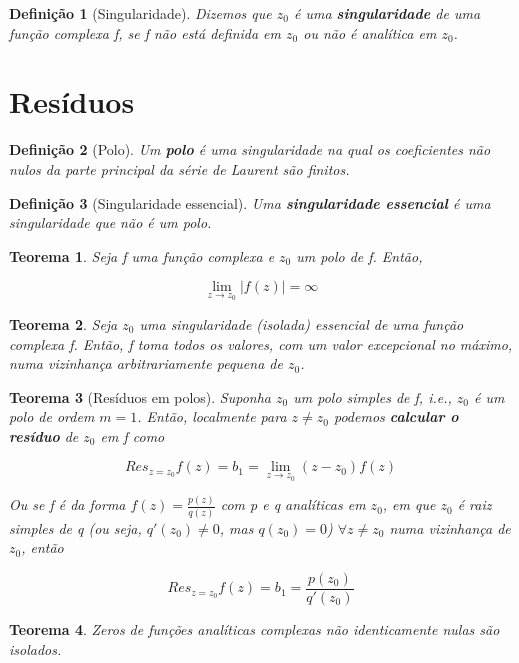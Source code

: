 \documentclass{article}
\newtheorem{theorem}{Teorema}
\newtheorem{definition}{Definição}
\begin{document}
\begin{definition}[Singularidade]
Dizemos que $z_0$ é uma \textbf{singularidade} de uma função complexa f, se f não está definida em $z_0$ ou não é analítica em $z_0$.
\end{definition}

\section*{Resíduos}
\label{s9}
\begin{definition}[Polo]
Um \textbf{polo} é uma singularidade na qual os coeficientes não nulos da parte principal da série de Laurent são finitos.
\end{definition}

\begin{definition}[Singularidade essencial] Uma \textbf{singularidade essencial} é uma singularidade que não é um polo.
\end{definition}

\begin{theorem}
Seja f uma função complexa e $z_0$ um polo de f. Então,

$$\lim_{z \rightarrow z_0} |f(z)| = \infty$$
\end{theorem}

\begin{theorem}
Seja $z_0$ uma singularidade (isolada) essencial de uma função complexa f. Então, f toma todos os valores, com um valor excepcional no máximo, numa vizinhança arbitrariamente pequena de $z_0$.
\end{theorem}

\begin{theorem}[Resíduos em polos]
Suponha $z_0$ um polo simples de f, i.e., $z_0$ é um polo de ordem $m=1$. Então, localmente para $z \neq z_0$ podemos \textbf{calcular o resíduo} de $z_0$ em f como

$$Res_{z = z_0} f(z) = b_1 = \lim_{z \rightarrow z_0} (z - z_0) f(z)$$

Ou se f é da forma $f(z) = \frac{p(z)}{q(z)}$ com p e q analíticas em $z_0$, em que $z_0$ é raiz simples de q (ou seja, $q'(z_0) \neq 0$, mas $q(z_0) = 0$) $\forall z \neq z_0$ numa vizinhança de $z_0$, então

$$Res_{z = z_0} f(z) = b_1 = \frac{p(z_0)}{q'(z_0)}$$
\end{theorem}

\begin{theorem}
Zeros de funções analíticas complexas não identicamente nulas são isolados.
\end{theorem}
\end{document}
